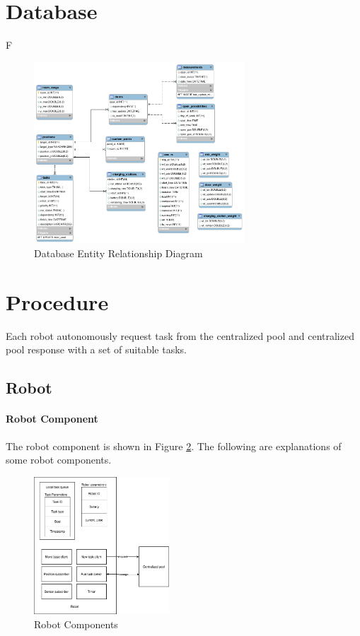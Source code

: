 \section{Database}
F
\begin{figure}[htbp]
    \centering
    \includegraphics[width = 0.7\textwidth]{content/images/ch4/database_er.png}
    \caption{Database Entity Relationship Diagram}
    \label{}
\end{figure}



\section{Procedure}
Each robot autonomously request task from the centralized pool and centralized pool response with a set of suitable tasks. 
\subsection{Robot}
\paragraph{Robot Component} The robot component is shown in Figure \ref{fig:robot_components}. The following are explanations of some robot components.


\begin{figure}[htbp]
	\centering
	\includegraphics[width = 0.45\textwidth]{content/images/ch4/system_component_robot.drawio.png}
	\caption{Robot Components}
	\label{fig:robot_components}
\end{figure}


